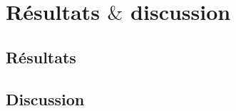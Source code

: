 \clearemptydoublepage
\chapter{Résultats $\&$  discussion}

\section{Résultats}



\section{Discussion}

